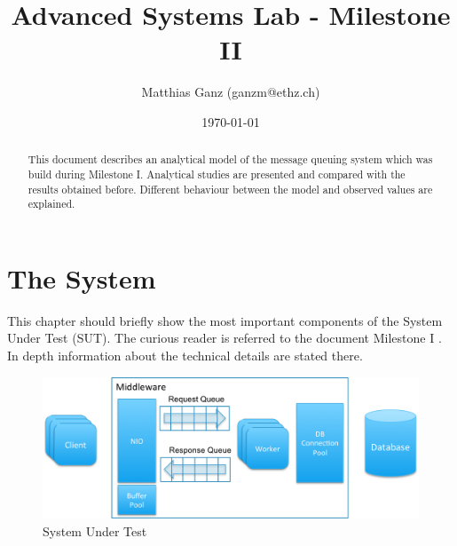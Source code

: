\documentclass[a4paper]{article}
\title{Advanced Systems Lab - Milestone II}
\author{Matthias Ganz (ganzm@ethz.ch)}
\date{\today}
\begin{document}
\maketitle

\pagebreak

\tableofcontents

\pagebreak

\begin{abstract}

This document describes an analytical model of the message queuing system which was build during Milestone I. Analytical studies are presented and compared with the results obtained before. Different behaviour between the model and observed values are explained.


\end{abstract}

\pagebreak

\section{The System}

This chapter should briefly show the most important components of the System Under Test (SUT). The curious reader is referred to the document Milestone I \cite{milestone1}. In depth information about the technical details are stated there.



\begin{figure}[H]
	\begin{center}
    \includegraphics[scale=0.6]{../drawings/broker-threading.png}
  \end{center}
  \caption{System Under Test}
  \label{fig:sut}
\end{figure}

\end{document}
